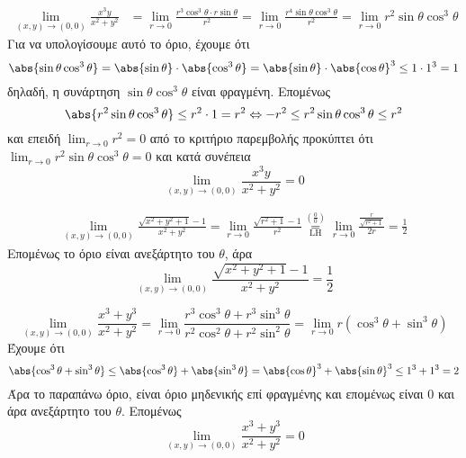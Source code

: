 \begin{example}
  \begin{align*}
    \lim\limits_{(x,y)\to (0, 0)} \frac{x^{3}y}{x^{2}+y^{2}} &= 
    \lim_{r \to 0} \frac{r^{3} \cos^{3}{\theta} \cdot r 
      \sin{\theta}}{r^{2}} = \lim_{r \to 0} \frac{r^{4} \sin{\theta} 
    \cos^{3}{\theta}}{r^{2}} = 
    \lim_{r \to 0} r^{2} \sin{\theta} \cos^{3}{\theta} 
  \end{align*}
  Για να υπολογίσουμε αυτό το όριο, έχουμε ότι
  \[
    \abs{\sin{\theta} \cos^{3}{\theta}} = \abs{\sin{\theta}} \cdot 
    \abs{\cos^{3}{\theta}} = \abs{\sin{\theta}} \cdot \abs{\cos{\theta}}^{3} \leq 
    1 \cdot 1^{3} = 1 
  \] 
  δηλαδή, η συνάρτηση $ \sin{\theta} \cos^{3}{\theta} $ είναι φραγμένη.
  Επομένως
  \[ 
    \abs{r^{2} \sin{\theta} \cos^{3}{\theta}} \leq r^{2} \cdot 1 = r^{2} \Leftrightarrow 
    -r^{2} \leq r^{2} \sin{\theta} \cos^{3}{\theta} \leq r^{2}
  \] 
  και επειδή $ \lim_{r \to 0} r^{2} = 0 $ από το κριτήριο παρεμβολής προκύπτει ότι 
  $ \lim_{r \to 0} r^{2} \sin{\theta} \cos^{3}{\theta} = 0 $ και κατά συνέπεια
  \[
    \lim\limits_{(x,y)\to (0,0)} \frac{x^{3}y}{x^{2}+y^{2}} = 0
  \] 
\end{example}

\begin{example}
  \begin{align*}
    \lim\limits_{(x,y)\to (0, 0)} \frac{\sqrt{x^{2}+y^{2}+1}-1}
    {x^{2}+y^{2}} = \lim_{r \to 0} \frac{\sqrt{r^{2}+1} -1}{r^{2}} 
    \overset{\left(\frac{0}{0}\right)}{\underset{\text{LH}}{=}} 
    \lim_{r \to 0} \frac{\frac{r}{\sqrt{r^{2}+1}}}{2r} = \frac{1}{2}
  \end{align*}
  Επομένως το όριο είναι ανεξάρτητο του $\theta$, άρα 
  \[
    \lim\limits_{(x,y)\to (0, 0)} 
    \frac{\sqrt{x^{2}+y^{2}+1} -1}{x^{2}+y^{2}} = \frac{1}{2} 
  \] 
\end{example}

\begin{example}
  \[ 
    \lim\limits_{(x,y)\to (0, 0)} \frac{x^{3}+y^{3}}{x^{2}+y^{2}} = \lim_{r \to 0}
    \frac{r^{3} \cos^{3}{\theta} + r^{3} \sin^{3}{\theta}}{r^{2} \cos^{2}{\theta} +
    r^{2} \sin^{2}{\theta}} = \lim_{r \to 0} 
    r(\cos^{3}{\theta} + \sin^{3}{\theta}) 
  \] 
  Έχουμε ότι
  \[
    \abs{\cos^{3}{\theta} + \sin^{3}{\theta}} \leq \abs{\cos^{3}{\theta}} + 
    \abs{\sin^{3}{\theta}} = \abs{\cos{\theta} }^{3} + \abs{\sin{\theta} }^{3} \leq 
    1^{3} + 1^{3} = 2
  \] 
  Άρα το παραπάνω όριο, είναι όριο μηδενικής επί φραγμένης και επομένως είναι 0 και άρα
  ανεξάρτητο του $\theta$. Επομένως 
  \[
    \lim\limits_{(x,y)\to (0, 0)} \frac{x^{3}+y^{3}}{x^{2}+y^{2}} = 0 
  \] 
\end{example}


